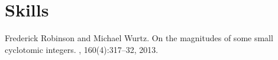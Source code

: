 \documentclass[12pt,a4paper,unicode]{moderncv}
\begin{document}
\section{Skills}


\nocite{*}



\begin{thebibliography}{1}

Frederick Robinson and Michael Wurtz.
\newblock On the magnitudes of some small cyclotomic integers.
, 160(4):317--32, 2013.

\end{thebibliography}
\end{document}
